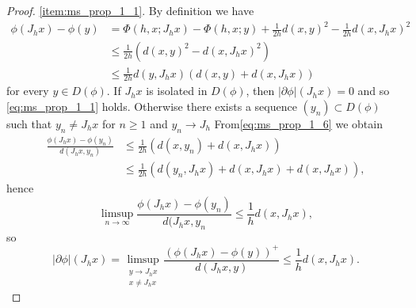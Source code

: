 \documentclass[a4paper,11pt, leqno]{scrreprt} %
\renewcommand{\leq}{\leqslant}
\renewcommand{\leq}{\leqslant}
\renewcommand{\geq}{\geqslant}
\theoremstyle{change}
\theoremstyle{nonumberplain}
\newtheorem{proof}{Proof}
\begin{document}
\begin{proof}
  \ref{item:ms_prop_1_1}. By definition we have 
  \begin{equation}
    \label{eq:ms_prop_1_6}
    \begin{split}
      \phi(J_h x) - \phi(y) &= \Phi(h, x; J_h x) - \Phi(h, x; y) +
      \frac1{2h} d(x,y)^2 - \frac1{2h} d(x, J_h x)^2\\
      &\leq \frac1{2h} (d(x, y)^2 - d(x, J_h x)^2)\\
      &\leq \frac1{2h} d(y, J_h x)(d(x, y) + d(x, J_h x))
    \end{split}
  \end{equation}
  for every $y \in D(\phi)$. If $J_h x$ is isolated in $D(\phi)$, then
  $|\partial \phi|(J_h x) = 0$ and so \eqref{eq:ms_prop_1_1}
  holds. Otherwise there exists a sequence $(y_n) \subset D(\phi)$
  such that $y_n \neq J_h x$ for $n \geq 1$ and $y_n \to J_h$ From\eqref{eq:ms_prop_1_6} we obtain
  \begin{equation}
    \label{eq:ms_prop_1_7}
    \begin{split}
      \frac{\phi(J_h x) - \phi(y_n)}{d(J_h x, y_n)} &\leq \frac1{2h}
    (d(x, y_n) + d(x, J_h x))\\
    &\leq \frac1{2h} (d(y_n, J_h x) + d(x, J_h x) + d(x, J_h x)),
    \end{split}
  \end{equation}
  hence
  \begin{equation}
    \label{eq:ms_prop_1_8}
    \limsup_{n \to \infty} \frac{\phi(J_h x) - \phi(y_n)}{d(J_h x,
      y_n} \leq \frac1h d(x, J_h x),
  \end{equation}
  so
  \begin{equation}
    \label{eq:ms_prop_1_9}
    |\partial \phi|(J_h x) = \limsup_{\substack{y \to J_h x\\ x \neq
        J_h x}} \frac{(\phi(J_h x) - \phi(y))^+}{d(J_h x, y)} \leq
    \frac1h d(x, J_h x).
  \end{equation}


\end{proof}
\end{document}
